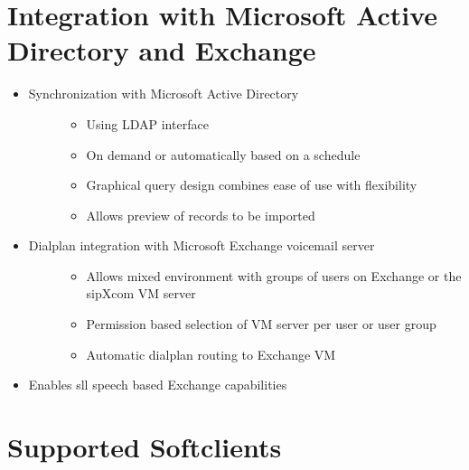 \documentclass[letterpaper,10pt,english]{sphinxmanual}
\begin{document}
\section{Integration with Microsoft Active Directory and Exchange}
\label{\detokenize{features:integration-with-microsoft-active-directory-and-exchange}}\begin{itemize}
\item {} \begin{description}
\item[{Synchronization with Microsoft Active Directory}] \leavevmode\begin{itemize}
\item {} 
Using LDAP interface

\item {} 
On demand or automatically based on a schedule

\item {} 
Graphical query design combines ease of use with flexibility

\item {} 
Allows preview of records to be imported

\end{itemize}

\end{description}

\item {} \begin{description}
\item[{Dialplan integration with Microsoft Exchange voicemail server}] \leavevmode\begin{itemize}
\item {} 
Allows mixed environment with groups of users on Exchange or the sipXcom VM server

\item {} 
Permission based selection of VM server per user or user group

\item {} 
Automatic dialplan routing to Exchange VM

\end{itemize}

\end{description}

\item {} 
Enables sll speech based Exchange capabilities

\end{itemize}


\section{Supported Softclients}
\label{\detokenize{features:supported-softclients}}
\end{document}
